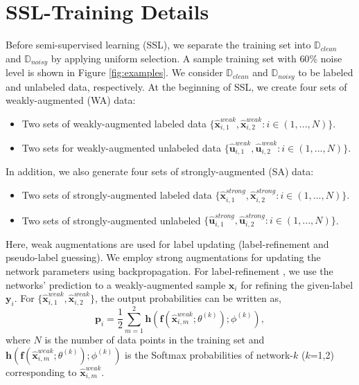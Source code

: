 \documentclass[10pt,twocolumn,letterpaper]{article}
\begin{document}
\section{SSL-Training Details} \label{sec:SSL_Training}
Before semi-supervised learning (SSL), we separate the training set into $\mathbb{D}_{clean}$ and $\mathbb{D}_{noisy}$ by applying uniform selection. A sample training set with $60\%$ noise level is shown in Figure \ref{fig:examples}. We consider $\mathbb{D}_{clean}$ and $\mathbb{D}_{noisy}$ to be labeled and unlabeled data, respectively. At the beginning of SSL, we create four sets of weakly-augmented (WA) data:
\begin{itemize}
    \item Two sets of weakly-augmented labeled data $\{\hat{\mathbf{x}}^{weak}_{i,1}, \hat{\mathbf{x}}^{weak}_{i,2}: i\in(1,...,N)\}$.
    \item Two sets for weakly-augmented unlabeled data $\{\hat{\mathbf{u}}^{weak}_{i,1}, \hat{\mathbf{u}}^{weak}_{i,2}: i\in(1,...,N)\}$.
\end{itemize}
In addition, we also generate four sets of strongly-augmented (SA) data: 
\begin{itemize}
    \item Two sets of strongly-augmented labeled data $\{\hat{\mathbf{x}}^{strong}_{i,1}, \hat{\mathbf{x}}^{strong}_{i,2}: i\in(1,...,N)\}$.
    \item Two sets of strongly-augmented unlabeled $\{\hat{\mathbf{u}}^{strong}_{i,1}, \hat{\mathbf{u}}^{strong}_{i,2}: i\in(1,...,N)\}$.
\end{itemize}

Here, weak augmentations are used for label updating (label-refinement and pseudo-label guessing). We employ strong augmentations for updating the network parameters using backpropagation. For label-refinement \cite{li2020dividemix}, we use the networks' prediction to a weakly-augmented sample $\mathbf{x}_i$ for refining the given-label $\mathbf{y}_i$. For $\{\hat{\mathbf{x}}^{weak}_{i,1}, \hat{\mathbf{x}}^{weak}_{i,2}\}$, the output probabilities can be written as,
\begin{equation} \label{eq:label_re}
    \mathbf{p}_i=\frac{1}{2}\sum_{m=1}^{2}\mathbf{h}(\mathbf{f}(\hat{\mathbf{x}}^{weak}_{i,m};\theta^{(k)}); \phi^{(k)}),
\end{equation}
where $N$ is the number of data points in the training set and $\mathbf{h}(\mathbf{f}(\hat{\mathbf{x}}^{weak}_{i,m};\theta^{(k)}); \phi^{(k)})$ is the Softmax probabilities of  network-$k$ ($k$=1,2) corresponding to $\hat{\mathbf{x}}^{weak}_{i,m}$.
\end{document}
